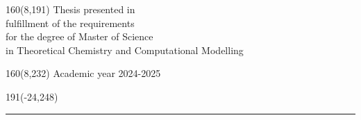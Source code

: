 \documentclass[12pt,a4paper,oneside]{book}
\begin{document}
%
\begin{textblock}{160}(8,191)
\textblockcolour{}
\vspace{-\parskip}
\flushright
Thesis presented in\\[4.5pt]
fulfillment of the requirements\\[4.5pt]
for the degree of Master of Science\\[4.5pt]
in Theoretical Chemistry and Computational Modelling\\
\end{textblock}
%
\begin{textblock}{160}(8,232)
\textblockcolour{}
\vspace{-\parskip}
\flushright
Academic year 2024-2025
\end{textblock}
%
\begin{textblock}{191}(-24,248)
{\color{blueline}\rule{550pt}{5.5pt}}
\end{textblock}
%


\setcounter{page}{0}
\onehalfspacing





\tableofcontents



\newpage
\setcounter{page}{0}








{}



\appendix

\end{document}
